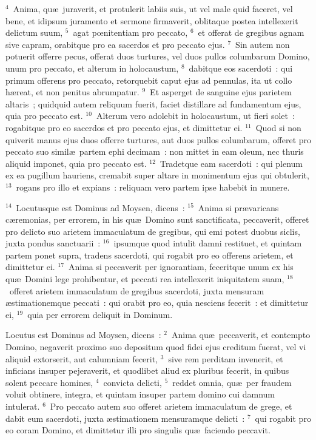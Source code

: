 ${}^{4}$~Anima, qu\ae\ juraverit, et protulerit labiis suis, ut vel male quid faceret, vel bene, et idipsum juramento et sermone firmaverit, oblitaque postea intellexerit delictum suum,
${}^{5}$~agat pœnitentiam pro peccato,
${}^{6}$~et offerat de gregibus agnam sive capram, orabitque pro ea sacerdos et pro peccato ejus.
${}^{7}$~Sin autem non potuerit offerre pecus, offerat duos turtures, vel duos pullos columbarum Domino, unum pro peccato, et alterum in holocaustum,
${}^{8}$~dabitque eos sacerdoti~: qui primum offerens pro peccato, retorquebit caput ejus ad pennulas, ita ut collo h\ae reat, et non penitus abrumpatur.
${}^{9}$~Et asperget de sanguine ejus parietem altaris~; quidquid autem reliquum fuerit, faciet distillare ad fundamentum ejus, quia pro peccato est.
${}^{10}$~Alterum vero adolebit in holocaustum, ut fieri solet~: rogabitque pro eo sacerdos et pro peccato ejus, et dimittetur ei.
${}^{11}$~Quod si non quiverit manus ejus duos offerre turtures, aut duos pullos columbarum, offeret pro peccato suo simil\ae\ partem ephi decimam~: non mittet in eam oleum, nec thuris aliquid imponet, quia pro peccato est.
${}^{12}$~Tradetque eam sacerdoti~: qui plenum ex ea pugillum hauriens, cremabit super altare in monimentum ejus qui obtulerit,
${}^{13}$~rogans pro illo et expians~: reliquam vero partem ipse habebit in munere.


${}^{14}$~Locutusque est Dominus ad Moysen, dicens~:
${}^{15}$~Anima si pr\ae varicans c\ae remonias, per errorem, in his qu\ae\ Domino sunt sanctificata, peccaverit, offeret pro delicto suo arietem immaculatum de gregibus, qui emi potest duobus siclis, juxta pondus sanctuarii~:
${}^{16}$~ipsumque quod intulit damni restituet, et quintam partem ponet supra, tradens sacerdoti, qui rogabit pro eo offerens arietem, et dimittetur ei.
${}^{17}$~Anima si peccaverit per ignorantiam, feceritque unum ex his qu\ae\ Domini lege prohibentur, et peccati rea intellexerit iniquitatem suam,
${}^{18}$~offeret arietem immaculatum de gregibus sacerdoti, juxta mensuram \ae stimationemque peccati~: qui orabit pro eo, quia nesciens fecerit~: et dimittetur ei,
${}^{19}$~quia per errorem deliquit in Dominum.

\lettrine[lines=3,image=true,loversize=0.05,lraise=-0.03]{L}{}ocutus est Dominus ad Moysen, dicens~:
${}^{2}$~Anima qu\ae\ peccaverit, et contempto Domino, negaverit proximo suo depositum quod fidei ejus creditum fuerat, vel vi aliquid extorserit, aut calumniam fecerit,
${}^{3}$~sive rem perditam invenerit, et inficians insuper pejeraverit, et quodlibet aliud ex pluribus fecerit, in quibus solent peccare homines,
${}^{4}$~convicta delicti,
${}^{5}$~reddet omnia, qu\ae\ per fraudem voluit obtinere, integra, et quintam insuper partem domino cui damnum intulerat.
${}^{6}$~Pro peccato autem suo offeret arietem immaculatum de grege, et dabit eum sacerdoti, juxta \ae stimationem mensuramque delicti~:
${}^{7}$~qui rogabit pro eo coram Domino, et dimittetur illi pro singulis qu\ae\ faciendo peccavit.


